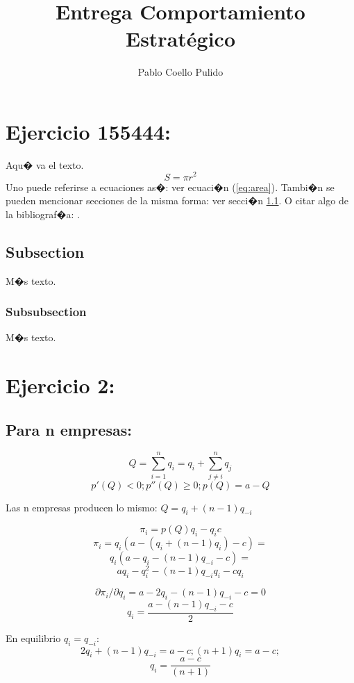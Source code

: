 \documentclass{article}
\title{Entrega Comportamiento Estrat\'egico}
\author{Pablo Coello Pulido\\
}
\theoremstyle{definition}
\theoremstyle{remark}
\begin{document}
\maketitle


\section{Ejercicio 155444:}

Aqu� va el texto.
\begin{equation}\label{eq:area}
  S = \pi r^2
\end{equation}
Uno puede referirse a ecuaciones as�: ver ecuaci�n (\ref{eq:area}).
Tambi�n se pueden mencionar secciones de la misma forma: ver secci�n
\ref{sec:nada}. O citar algo de la bibliograf�a: \cite{Cd94}.

\subsection{Subsection}\label{sec:nada}

M�s texto.

\subsubsection{Subsubsection}\label{sec:nada2}

M�s texto.
\section{Ejercicio 2:}
\subsection{Para n empresas:}

$$Q=\sum_{i=1}^nq_i=q_i+\sum_{j\neq i}^nq_j$$
$$p'(Q)<0; p''(Q)\geq0; p(Q)=a-Q$$

Las n empresas producen lo mismo: $Q=q_i+(n-1)q_{-i}$

$$\pi_i=p(Q)q_i-q_ic$$
$$\pi_i=q_i(a-(q_i+(n-1)q_i)-c)=$$
$$q_i(a-q_i-(n-1)q_{-i}-c)=$$
$$aq_i-q_i^2-(n-1)q_{-i}q_i-cq_i$$

$$\partial \pi_i/\partial q_i= a-2q_i-(n-1)q_{-i}-c=0$$
$$q_i=\frac{a-(n-1)q_{-i}-c}{2}$$

En equilibrio $q_i=q_{-i}$:
$$2q_i+(n-1)q_{-i}=a-c; (n+1)q_i=a-c;$$
$$q_i=\frac{a-c}{(n+1)}$$
\end{document}
